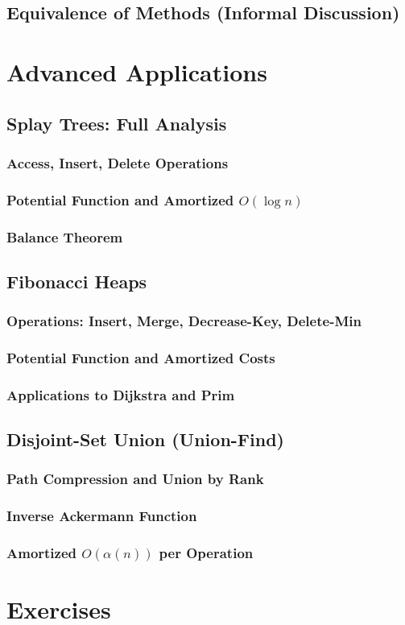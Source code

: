 \subsection{Equivalence of Methods (Informal Discussion)}

\section{Advanced Applications}
\subsection{Splay Trees: Full Analysis}
\subsubsection{Access, Insert, Delete Operations}
\subsubsection{Potential Function and Amortized $O(\log n)$}
\subsubsection{Balance Theorem}
\subsection{Fibonacci Heaps}
\subsubsection{Operations: Insert, Merge, Decrease-Key, Delete-Min}
\subsubsection{Potential Function and Amortized Costs}
\subsubsection{Applications to Dijkstra and Prim}
\subsection{Disjoint-Set Union (Union-Find)}
\subsubsection{Path Compression and Union by Rank}
\subsubsection{Inverse Ackermann Function}
\subsubsection{Amortized $O(\alpha(n))$ per Operation}

\section{Exercises}